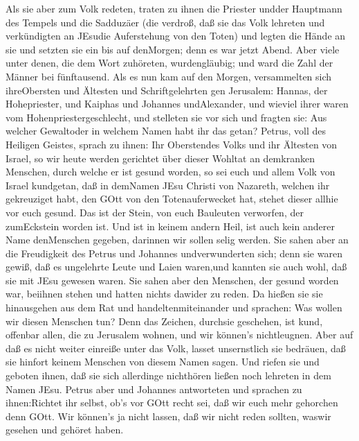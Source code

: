  Als sie aber zum Volk redeten, traten zu ihnen die Priester
undder Hauptmann des Tempels und die Sadduzäer  (die
verdroß, daß sie das Volk lehreten und verkündigten an JEsudie
Auferstehung von den Toten)  und legten die Hände an sie und
setzten sie ein bis auf denMorgen; denn es war jetzt Abend. 
Aber viele unter denen, die dem Wort zuhöreten, wurdengläubig; und ward
die Zahl der Männer bei fünftausend.  Als es nun kam auf den
Morgen, versammelten sich ihreObersten und Ältesten und Schriftgelehrten
gen Jerusalem:  Hannas, der Hohepriester, und Kaiphas und
Johannes undAlexander, und wieviel ihrer waren vom
Hohenpriestergeschlecht,  und stelleten sie vor sich und
fragten sie: Aus welcher Gewaltoder in welchem Namen habt ihr das getan?
 Petrus, voll des Heiligen Geistes, sprach zu ihnen: Ihr
Oberstendes Volks und ihr Ältesten von Israel,  so wir heute
werden gerichtet über dieser Wohltat an demkranken Menschen, durch
welche er ist gesund worden,  so sei euch und allem Volk
von Israel kundgetan, daß in demNamen JEsu Christi von Nazareth, welchen
ihr gekreuziget habt, den GOtt von den Totenauferwecket hat, stehet
dieser allhie vor euch gesund.  Das ist der Stein, von euch
Bauleuten verworfen, der zumEckstein worden ist.  Und ist
in keinem andern Heil, ist auch kein anderer Name denMenschen gegeben,
darinnen wir sollen selig werden.  Sie sahen aber an die
Freudigkeit des Petrus und Johannes undverwunderten sich; denn sie waren
gewiß, daß es ungelehrte Leute und Laien waren,und kannten sie auch
wohl, daß sie mit JEsu gewesen waren.  Sie sahen aber den
Menschen, der gesund worden war, beiihnen stehen und hatten nichts
dawider zu reden.  Da hießen sie sie hinausgehen aus dem
Rat und handeltenmiteinander und sprachen:  Was wollen wir
diesen Menschen tun? Denn das Zeichen, durchsie geschehen, ist kund,
offenbar allen, die zu Jerusalem wohnen, und wir können's nichtleugnen.
 Aber auf daß es nicht weiter einreiße unter das Volk,
lasset unsernstlich sie bedräuen, daß sie hinfort keinem Menschen von
diesem Namen sagen.  Und riefen sie und geboten ihnen, daß
sie sich allerdinge nichthören ließen noch lehreten in dem Namen JEsu.
 Petrus aber und Johannes antworteten und sprachen zu
ihnen:Richtet ihr selbst, ob's vor GOtt recht sei, daß wir euch mehr
gehorchen denn GOtt.  Wir können's ja nicht lassen, daß wir
nicht reden sollten, waswir gesehen und gehöret haben. 
